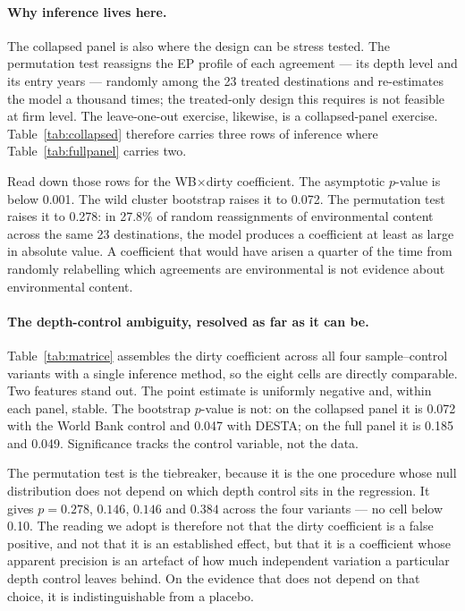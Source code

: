 \documentclass[11pt]{article}
\begin{document}


\paragraph{Why inference lives here.} The collapsed panel is also where the design can be stress
tested. The permutation test reassigns the EP profile of each agreement --- its depth level and its
entry years --- randomly among the 23 treated destinations and re-estimates the model a thousand
times; the treated-only design this requires is not feasible at firm level. The leave-one-out
exercise, likewise, is a collapsed-panel exercise. Table~\ref{tab:collapsed} therefore carries three
rows of inference where Table~\ref{tab:fullpanel} carries two.

Read down those rows for the WB$\times$dirty coefficient. The asymptotic $p$-value is below 0.001.
The wild cluster bootstrap raises it to 0.072. The permutation test raises it to 0.278: in 27.8\% of
random reassignments of environmental content across the same 23 destinations, the model produces a
coefficient at least as large in absolute value. A coefficient that would have arisen a quarter of
the time from randomly relabelling which agreements are environmental is not evidence about
environmental content.

\paragraph{The depth-control ambiguity, resolved as far as it can be.} Table~\ref{tab:matrice}
assembles the dirty coefficient across all four sample--control variants with a single inference
method, so the eight cells are directly comparable. Two features stand out. The point estimate is
uniformly negative and, within each panel, stable. The bootstrap $p$-value is not: on the collapsed
panel it is 0.072 with the World Bank control and 0.047 with DESTA; on the full panel it is 0.185
and 0.049. Significance tracks the control variable, not the data.

The permutation test is the tiebreaker, because it is the one procedure whose null distribution
does not depend on which depth control sits in the regression. It gives $p = 0.278$, $0.146$,
$0.146$ and $0.384$ across the four variants --- no cell below 0.10. The reading we adopt is
therefore not that the dirty coefficient is a false positive, and not that it is an established
effect, but that it is a coefficient whose apparent precision is an artefact of how much
independent variation a particular depth control leaves behind. On the evidence that does not
depend on that choice, it is indistinguishable from a placebo.
\end{document}
